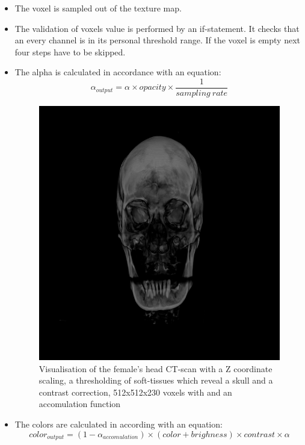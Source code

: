 \documentclass[twoside, english, 11pt]{report}
\begin{document}
\begin{itemize}
\item The voxel is sampled out of the texture map.
\item The validation of voxels value is performed by an if-statement. It checks that an every channel is in its personal threshold range. If the voxel is empty next four steps have to be skipped.
\item The alpha is calculated in accordance with an equation:
\begin{equation} \label{eq:alpha}
\alpha_{output} = \alpha \times opacity \times \frac {1}{{sampling\ rate}}
\end{equation}
\begin{figure}[H]
\centerline{\includegraphics[scale = 0.6]{img/head-th-win}}
\caption{Visualisation of the female's head CT-scan with a Z coordinate scaling, a thresholding of soft-tissues which reveal a skull and a contrast correction, 512x512x230 voxels with and an accomulation function\label{fig:head-th-win}}
\end{figure}
\item The colors are calculated in according with an equation:
\begin{equation} \label{eq:color}
color_{output} = (1 - \alpha_{accomulation}) \times (color + brighness) \times contrast  \times \alpha
\end{equation}\\


\end{itemize}
\end{document}
